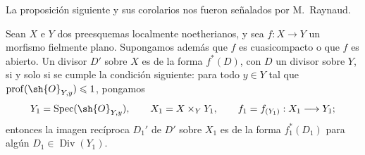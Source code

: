 
La proposición siguiente y sus corolarios nos fueron señalados por
M.~Raynaud.

\begin{proposition}[21.4.9]
\ifdefined\EGAIVSuppressErratumLabels\else\label{IV.21.4.9}\fi
Sean $X$ e $Y$ dos preesquemas localmente noetherianos, y sea
$f:X\to Y$ un morfismo fielmente plano. Supongamos además que $f$ es
cuasicompacto \textup{o} que $f$ es abierto. Un divisor $D'$ sobre $X$ es de la
forma $f^*(D)$, con $D$ un divisor sobre $Y$, si y solo si se cumple la
condición siguiente: para todo $y\in Y$ tal que
$\operatorname{prof}(\sh{O}_{Y,y})\leq 1$, pongamos
\[
 Y_1=\operatorname{Spec}(\sh{O}_{Y,y}),\qquad
 X_1=X\times_Y Y_1,
 \qquad f_1=f_{(Y_1)}:X_1\to Y_1;
\]
entonces la imagen recíproca $D_1'$ de $D'$ sobre $X_1$ es de la forma
$f_1^*(D_1)$ para algún $D_1\in\operatorname{Div}(Y_1)$.
\end{proposition}

